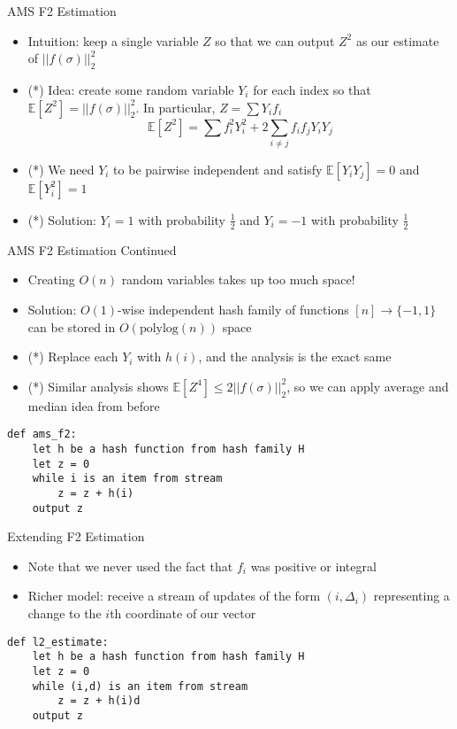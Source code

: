 \documentclass[aspectratio=169]{beamer}
\begin{document}
\begin{frame}{AMS F2 Estimation}
\protect\hypertarget{ams-f2-estimation}{}
\begin{itemize}
\tightlist
\item
  Intuition: keep a single variable \(Z\) so that we can output \(Z^2\)
  as our estimate of \(||f(\sigma)||_2^2\) \pause
\item
  (*) Idea: create some random variable \(Y_i\) for each index so that
  \(\mathbb{E}[Z^2] = ||f(\sigma)||_2^2\). In particular,
  \(Z = \sum Y_i f_i\)
  \[ \mathbb{E}[Z^2] = \sum f_i^2 Y_i^2 + 2\sum_{i \neq j} f_i f_j Y_i Y_j\]
\item
  (*) We need \(Y_i\) to be pairwise independent and satisfy
  \(\mathbb{E}[Y_iY_j] = 0\) and \(\mathbb{E}[Y_i^2] = 1\) \pause
\item
  (*) Solution: \(Y_i = 1\) with probability \(\frac{1}{2}\) and
  \(Y_i = -1\) with probability \(\frac{1}{2}\) 
\end{itemize}
\end{frame}

\begin{frame}[fragile]{AMS F2 Estimation Continued}
\protect\hypertarget{ams-f2-estimation-continued}{}
\begin{itemize}
\tightlist
\item
  Creating \(O(n)\) random variables takes up too much space!
\item
  Solution: \(O(1)\)-wise independent hash family of functions
  \([n] \to \{-1,1\}\) can be stored in \(O(\text{polylog}(n))\) space \pause
\item
  (*) Replace each \(Y_i\) with \(h(i)\), and the analysis is the exact same \pause
\item
  (*) Similar analysis shows \(\mathbb{E}[Z^4] \leq 2||f(\sigma)||_2^2\), so
  we can apply average and median idea from before \pause
\end{itemize}

\begin{verbatim}
def ams_f2:
    let h be a hash function from hash family H
    let z = 0
    while i is an item from stream
        z = z + h(i)
    output z
\end{verbatim}
\end{frame}

\begin{frame}[fragile]{Extending F2 Estimation}
\protect\hypertarget{extending-f2-estimation}{}
\begin{itemize}
\tightlist
\item
  Note that we never used the fact that \(f_i\) was positive or integral
\item
  Richer model: receive a stream of updates of the form
  \((i, \Delta_i)\) representing a change to the \(i\)th coordinate of
  our vector \pause
\end{itemize}

\begin{verbatim}
def l2_estimate:
    let h be a hash function from hash family H
    let z = 0
    while (i,d) is an item from stream
        z = z + h(i)d
    output z
\end{verbatim}
\end{frame}
\end{document}
